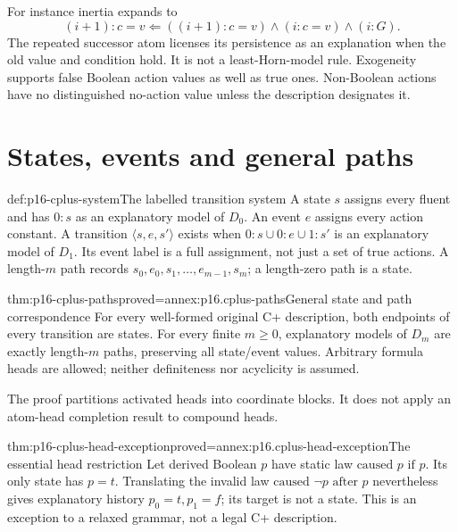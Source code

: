For instance inertia expands to
\[
 (i+1):c=v\Leftarrow
             ((i+1):c=v)\land(i:c=v)\land(i:G).
\]
The repeated successor atom licenses its persistence as an explanation
when the old value and condition hold. It is not a least-Horn-model rule.
Exogeneity supports false Boolean action values as well as true ones.
Non-Boolean actions have no distinguished no-action value unless the
description designates it.

\section{States, events and general paths}
\label{sec:p16-cplus-transition}

\begin{hbdefinition}{def:p16-cplus-system}{The labelled transition system}
A state \(s\) assigns every fluent and has \(0:s\) as an explanatory
model of \(D_0\). An event \(e\) assigns every action constant.
A transition \(\langle s,e,s'\rangle\) exists when
\(0:s\cup0:e\cup1:s'\) is an explanatory model of \(D_1\).
Its event label is a full assignment, not just a set of true actions.
A length-\(m\) path records \(s_0,e_0,s_1,\ldots,e_{m-1},s_m\);
a length-zero path is a state.
\end{hbdefinition}

\begin{hbtheorem}{thm:p16-cplus-paths}{proved=annex:p16.cplus-paths}{General state and path correspondence}
For every well-formed original C+ description, both endpoints of every
transition are states. For every finite \(m\geq0\), explanatory models
of \(D_m\) are exactly length-\(m\) paths, preserving all state/event
values. Arbitrary formula heads are allowed; neither definiteness nor
acyclicity is assumed.
\end{hbtheorem}

The proof partitions activated heads into coordinate blocks. It does
not apply an atom-head completion result to compound heads.

\begin{hbtheorem}{thm:p16-cplus-head-exception}{proved=annex:p16.cplus-head-exception}{The essential head restriction}
Let derived Boolean \(p\) have static law
\(\text{caused }p\text{ if }p\). Its only state has \(p=t\).
Translating the invalid law \(\text{caused }\neg p\text{ after }p\)
nevertheless gives explanatory history \(p_0=t,p_1=f\);
its target is not a state. This is an exception to a relaxed grammar,
not a legal C+ description.
\end{hbtheorem}

